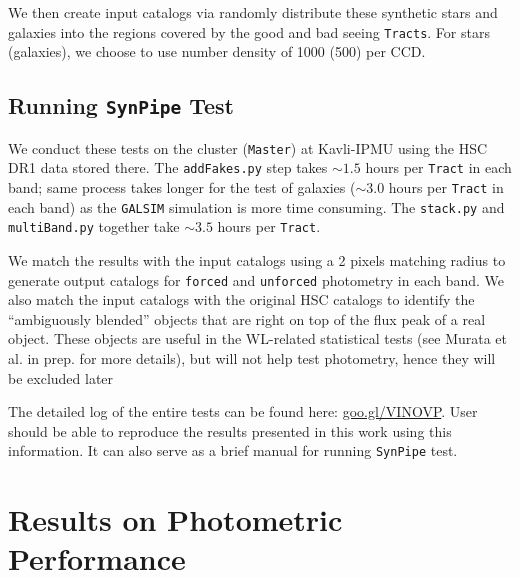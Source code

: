 \documentclass[useamsfonts]{pasj01}
\def\synpipe{\texttt{SynPipe}}
\def\forced{\texttt{forced}}
\def\unforced{\texttt{unforced}}
\def\tract{\texttt{Tract}}
\def\tracts{\texttt{Tracts}}
\def\galsim{\texttt{G}{\scriptsize \texttt{AL}}\texttt{S}{\scriptsize \texttt{IM}}}
\begin{document}
    We then create input catalogs via randomly distribute these synthetic stars and
    galaxies into the regions covered by the good and bad seeing \tracts{}.
    For stars (galaxies), we choose to use number density of 1000 (500)
    per CCD.



\subsection{Running \synpipe{} Test}
    \label{ssec:running}

    We conduct these tests on the cluster (\texttt{Master}) at Kavli-IPMU using
    the HSC DR1 data stored there.
    The \texttt{addFakes.py} step takes ${\sim}1.5$ hours per \tract{} in each
    band; same process takes longer for the test of galaxies (${\sim}3.0$ hours per
    \tract{} in each band) as the \galsim{} simulation is more time consuming.
    The \texttt{stack.py} and \texttt{multiBand.py} together take ${\sim}3.5$ hours
    per \tract{}.

    We match the results with the input catalogs using a 2 pixels matching radius
    to generate output catalogs for \forced{} and \unforced{} photometry
    in each band.
    We also match the input catalogs with the original HSC catalogs to identify the
    ``ambiguously blended'' objects that are right on top of the flux peak of a real
    object.
    These objects are useful in the WL-related statistical tests (see Murata et al.
    in prep. for more details), but will not help test photometry, hence they will
    be excluded later

    The detailed log of the entire tests can be found here:
    \url{goo.gl/VINOVP}.
    User should be able to reproduce the results presented in this work using this
    information.
    It can also serve as a brief manual for running \synpipe{} test.


\section{Results on Photometric Performance}
    \label{sec:result}
\end{document}
